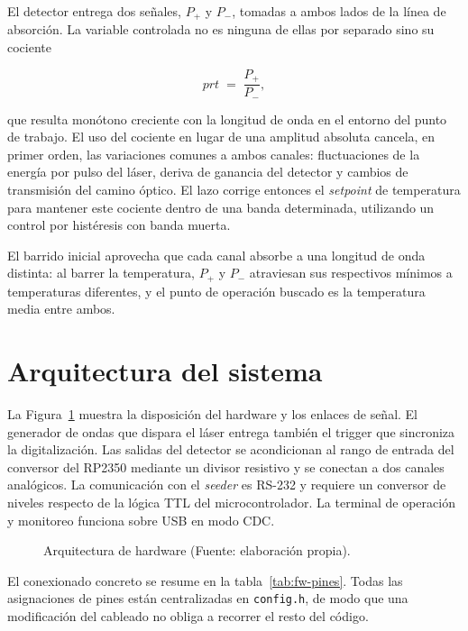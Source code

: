 El detector entrega dos señales, $P_+$ y $P_-$, tomadas a ambos lados de la línea de absorción. La variable controlada no es ninguna de ellas por separado sino su cociente

\begin{equation}
  \mathit{prt} \;=\; \frac{P_+}{P_-},
  \label{eq:prt}
\end{equation}

\noindent que resulta monótono creciente con la longitud de onda en el entorno del punto de trabajo. El uso del cociente en lugar de una amplitud absoluta cancela, en primer orden, las variaciones comunes a ambos canales: fluctuaciones de la energía por pulso del láser, deriva de ganancia del detector y cambios de transmisión del camino óptico. El lazo corrige entonces el \emph{setpoint} de temperatura para mantener este cociente dentro de una banda determinada, utilizando un control por histéresis con banda muerta.

El barrido inicial aprovecha que cada canal absorbe a una longitud de onda distinta: al barrer la temperatura, $P_+$ y $P_-$ atraviesan sus respectivos mínimos a temperaturas diferentes, y el punto de operación buscado es la temperatura media entre ambos. 

\section{Arquitectura del sistema}
\label{sec:fw-arquitectura}

La Figura~\ref{fig:fw-arquitectura} muestra la disposición del hardware y los enlaces de señal. El generador de ondas que dispara el láser entrega también el trigger que sincroniza la digitalización. Las salidas del detector se acondicionan al rango de entrada del conversor del RP2350 mediante un divisor resistivo y se conectan a dos canales analógicos. La comunicación con el \emph{seeder} es RS-232 y requiere un conversor de niveles respecto de la lógica TTL del microcontrolador. La terminal de operación y monitoreo funciona sobre USB en modo CDC.

\begin{figure}[htpb]
\centering
\resizebox{\textwidth}{!}{}
\caption[Arquitectura de hardware del sistema de control]%
{Arquitectura de hardware (Fuente: elaboración propia).}
\label{fig:fw-arquitectura}
\end{figure}

El conexionado concreto se resume en la tabla~\ref{tab:fw-pines}. Todas las asignaciones de pines están centralizadas en \texttt{config.h}, de modo que una modificación del cableado no obliga a recorrer el resto del código.

